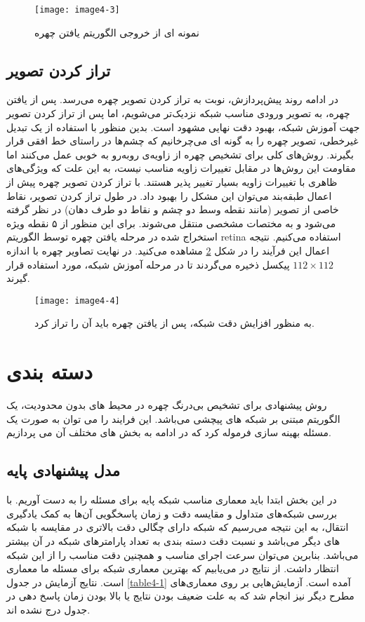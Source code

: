 \begin{figure}[h]
\centering
  \texttt{[image: image4-3]}
  \caption{نمونه ای از خروجی الگوریتم یافتن چهره}
  \label{image4-3}
\end{figure}

\subsection{تراز کردن تصویر}
در ادامه روند پیش‌پردازش، نوبت به تراز کردن تصویر چهره  می‌رسد. پس از یافتن چهره، به تصویر ورودی مناسب شبکه نزدیک‌تر می‌شویم، اما پس از تراز کردن تصویر جهت آموزش شبکه، بهبود دقت نهایی مشهود است.  بدین منظور با استفاده از یک تبدیل غیرخطی، تصویر چهره را به گونه ای می‌چرخانیم که چشم‌ها در راستای خط افقی قرار بگیرند. روش‌های کلی برای تشخیص چهره از زاویه‌ی روبه‌رو به خوبی عمل می‌کنند اما مقاومت این روش‌ها در مقابل تغییرات زاویه مناسب نیست، به این علت که ویژگی‌های ظاهری با تغییرات زاویه بسیار تغییر پذیر هستند. با تراز کردن تصویر چهره پیش از اعمال طبقه‌بند می‌توان این مشکل را بهبود داد. در طول ‌تراز کردن تصویر، نقاط خاصی از تصویر (مانند نقطه‌ وسط دو چشم و نقاط دو طرف دهان) در نظر گرفته می‌شود و به مختصات مشخصی منتقل می‌شوند. برای این منظور از ۵ نقطه ویژه استخراج شده در مرحله یافتن چهره توسط الگوریتم retina استفاده می‌کنیم. نتیجه اعمال این فرآیند را در شکل \ref{image4-4} مشاهده می‌کنید. در نهایت تصاویر چهره با اندازه $112 \times 112$ پیکسل ذخیره می‌گردند تا در مرحله آموزش شبکه، مورد استفاده قرار گیرند.
\begin{figure}[h]
\centering
  \texttt{[image: image4-4]}
  \caption{به منظور افزایش دقت شبکه، پس از یافتن چهره باید آن را تراز کرد.}
  \label{image4-4}
\end{figure}

\section{دسته بندی}
روش پیشنهادی برای تشخیص بی‌درنگ چهره در محیط های بدون محدودیت، یک الگوریتم مبتنی بر شبکه های پیچشی می‌باشد. این فرایند را می توان به صورت یک مسئله بهینه سازی فرموله کرد که در ادامه به بخش های مختلف آن می پردازیم.

\subsection{مدل پیشنهادی پایه}
در این بخش ابتدا باید معماری مناسب شبکه پایه برای مسئله را به دست آوریم. با بررسی شبکه‌های متداول و مقایسه دقت و زمان پاسخگویی آن‌ها به کمک یادگیری انتقال، به این نتیجه می‌رسیم که شبکه  دارای چگالی دقت بالاتری در مقایسه با شبکه های دیگر می‌باشد و نسبت دقت دسته بندی به تعداد پارامترهای شبکه در آن‌ بیشتر می‌باشد. بنابرین می‌توان سرعت اجرای مناسب و همچنین دقت مناسب را از این شبکه‌ انتظار داشت. از نتایج در می‌یابیم که بهترین معماری شبکه برای مسئله ما معماری  است. نتایج آزمایش در جدول \ref{table4-1} آمده است. آزمایش‌هایی بر روی معماری‌های مطرح دیگر نیز انجام شد که به علت ضعیف بودن نتایج یا بالا بودن زمان پاسخ دهی در جدول درج نشده اند.


